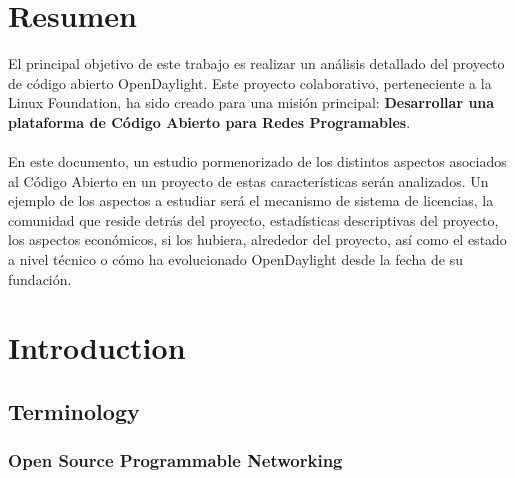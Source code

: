 \documentclass[a4paper, 12pt]{book}
\begin{document}
\chapter*{Resumen}
\label{chap:resumen}

El principal objetivo de este trabajo es realizar un análisis detallado del proyecto de código abierto OpenDaylight. Este proyecto colaborativo, perteneciente a la Linux Foundation, ha sido creado para una misión principal: \textbf{Desarrollar una plataforma de Código Abierto para Redes Programables}.\\
\\
En este documento, un estudio pormenorizado de los distintos aspectos asociados al Código Abierto en un proyecto de estas características serán analizados. Un ejemplo de los aspectos a estudiar será el mecanismo de sistema de licencias, la comunidad que reside detrás del proyecto, estadísticas descriptivas del proyecto, los aspectos económicos, si los hubiera, alrededor del proyecto, así como el estado a nivel técnico o cómo ha evolucionado OpenDaylight desde la fecha de su fundación.


\chapter{Introduction}
\label{chap:introduction}

\section{Terminology}
\label{sec:terminology}

\subsection{Open Source Programmable Networking}
\label{subsec:freesoftware}
\end{document}
